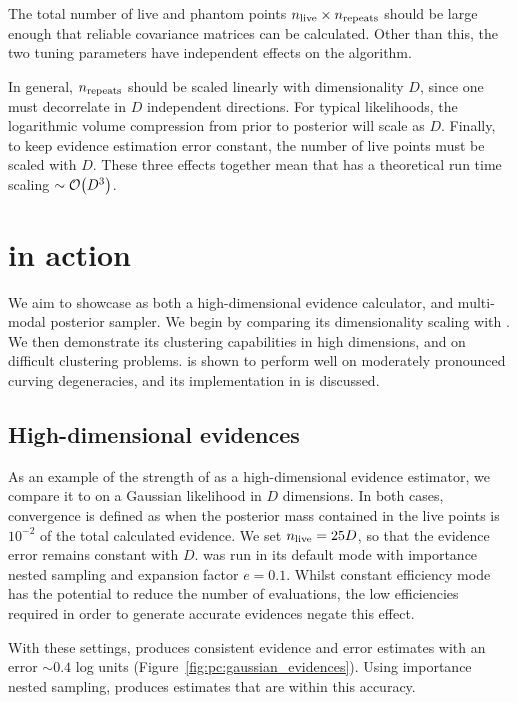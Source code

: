 The total number of live and phantom points ${n_{\mathrm{live}}\times n_{\mathrm{repeats}}}$ should be large enough that reliable covariance matrices can be calculated. Other than this, the two tuning parameters have independent effects on the algorithm. 

In general, $n_{\mathrm{repeats}}$ should be scaled linearly with dimensionality $D$, since one must decorrelate in $D$ independent directions. For typical likelihoods, the logarithmic volume compression from prior to posterior will scale as $D$. Finally, to keep evidence estimation error constant, the number of live points must be scaled with $D$. These three effects together mean that \PolyChord{} has a theoretical run time scaling ${\sim\mathcal{O}{\left(D^3\right)}}$.

\section{\PolyChord{} in action}
\label{sec:pc:polychord_in_action}
We aim to showcase \PolyChord{} as both a high-dimensional evidence calculator, and multi-modal posterior sampler. We begin by comparing its dimensionality scaling with \MultiNest{}. We then demonstrate its clustering capabilities in high dimensions, and on difficult clustering problems. \PolyChord{} is shown to perform well on moderately pronounced curving degeneracies, and its implementation in \CosmoMC{} is discussed.

\subsection{High-dimensional evidences}
\label{sec:pc:hi_ev}

As an example of the strength of \PolyChord{} as a high-dimensional evidence estimator, we compare it to \MultiNest{} on a Gaussian likelihood in $D$ dimensions.  In both cases, convergence is defined as when the posterior mass contained in the live points is $10^{-2}$ of the total calculated evidence.  We set $n_{\mathrm{live}}=25D$, so that the evidence error remains constant with $D$. \MultiNest{} was run in its default mode with importance nested sampling and expansion factor $e=0.1$.  Whilst constant efficiency mode has the potential to reduce the number of \MultiNest{} evaluations, the low efficiencies required in order to generate accurate evidences negate this effect.                                       


With these settings, \PolyChord{} produces consistent evidence and error estimates with an error $\sim0.4$ log units (Figure~\ref{fig:pc:gaussian_evidences}). Using importance nested sampling, \MultiNest{} produces estimates that are within this accuracy.

